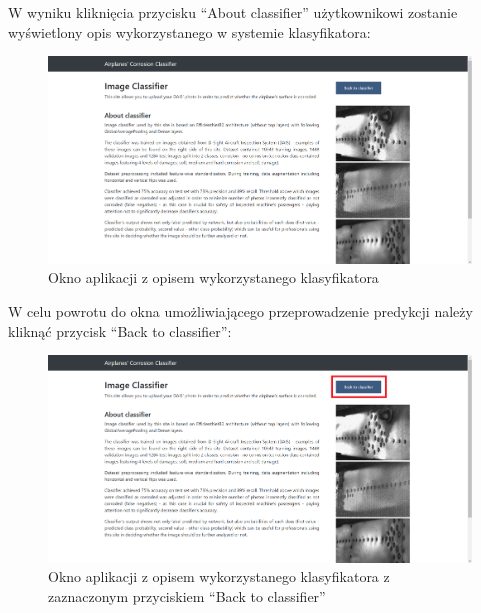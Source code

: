 \documentclass[polish,12pt]{aghthesis}
\begin{document}
\noindent W wyniku kliknięcia przycisku ``About classifier'' użytkownikowi zostanie wyświetlony opis wykorzystanego w systemie klasyfikatora:
\begin{figure}[h!]%
\centering
\includegraphics[width=16cm]{images/classifierDescription.PNG}
\caption{Okno aplikacji z opisem wykorzystanego klasyfikatora}
\end{figure}

\noindent W celu powrotu do okna umożliwiającego przeprowadzenie predykcji należy kliknąć przycisk ``Back to classifier'':
\begin{figure}[h!]%
\centering
\includegraphics[width=16cm]{images/backToClassifier.png}
\caption{ Okno aplikacji z opisem wykorzystanego klasyfikatora z zaznaczonym przyciskiem ``Back to classifier''}
\end{figure}

\newpage
\end{document}
